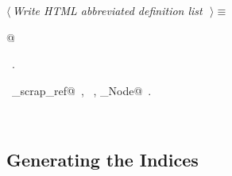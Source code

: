 \documentclass{report}
\begin{document}
\begin{flushleft} \small
\begin{minipage}{\linewidth} \label{scrap116}
$\langle\,${\it Write HTML abbreviated definition list}\nobreak\ {\footnotesize {}}$\,\rangle\equiv$
\vspace{-1ex}
\begin{list}{}{} \item
\mbox{}@{\NWsep}
\end{list}
\vspace{-1ex}
\footnotesize\addtolength{\baselineskip}{-1ex}
\begin{list}{}{\setlength{\itemsep}{-\parsep}\setlength{\itemindent}{-\leftmargin}}
\item \NWtxtMacroRefIn\ .
\end{list}
\vspace{-2ex}
\footnotesize\addtolength{\baselineskip}{-1ex}
\begin{list}{}{\setlength{\itemsep}{-\parsep}\setlength{\itemindent}{-\leftmargin}}
\item \NWtxtIdentsUsed\nobreak\  \verb@display_scrap_ref@\nobreak\ , \verb@fputs@\nobreak\ , \verb@Scrap_Node@\nobreak\ .\end{list}
\end{minipage}\\[4ex]
\end{flushleft}
\subsection{Generating the Indices}
\end{document}
